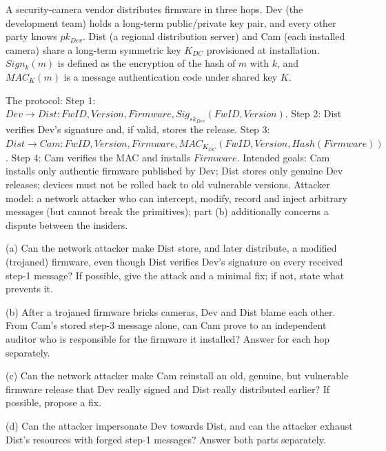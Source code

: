 \documentclass[12pt, a4paper]{article}
\begin{document}
\begin{problembox}
A security-camera vendor distributes firmware in three hops. Dev (the development team) holds a long-term public/private key pair, and every other party knows $pk_{Dev}$. Dist (a regional distribution server) and Cam (each installed camera) share a long-term symmetric key $K_{DC}$ provisioned at installation. $Sign_k(m)$ is defined as the encryption of the hash of $m$ with $k$, and $MAC_K(m)$ is a message authentication code under shared key $K$.

The protocol: Step 1: $Dev \to Dist : FwID, Version, Firmware, Sig_{sk_{Dev}}(FwID, Version)$. Step 2: Dist verifies Dev's signature and, if valid, stores the release.
Step 3: $Dist \to Cam : FwID, Version, Firmware, MAC_{K_{DC}}(FwID, Version, Hash(Firmware))$. Step 4: Cam verifies the MAC and installs $Firmware$.
Intended goals: Cam installs only authentic firmware published by Dev; Dist stores only genuine Dev releases; devices must not be rolled back to old vulnerable versions.
Attacker model: a network attacker who can intercept, modify, record and inject arbitrary messages (but cannot break the primitives); part (b) additionally concerns a dispute between the insiders.

(a) Can the network attacker make Dist store, and later distribute, a modified (trojaned) firmware, even though Dist verifies Dev's signature on every received step-1 message? If possible, give the attack and a minimal fix; if not, state what prevents it.

(b) After a trojaned firmware bricks cameras, Dev and Dist blame each other.
From Cam's stored step-3 message alone, can Cam prove to an independent auditor who is responsible for the firmware it installed? Answer for each hop separately.

(c) Can the network attacker make Cam reinstall an old, genuine, but vulnerable firmware release that Dev really signed and Dist really distributed earlier? If possible, propose a fix.

(d) Can the attacker impersonate Dev towards Dist, and can the attacker exhaust Dist's resources with forged step-1 messages? Answer both parts separately.
\end{problembox}
\end{document}
